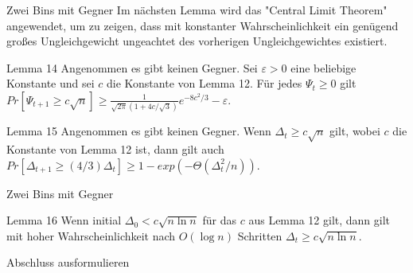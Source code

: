 \documentclass{beamer}
\begin{document}
    \begin{frame}{Zwei Bins mit Gegner}
        Im nächsten Lemma wird das "Central Limit Theorem" angewendet, um zu zeigen,
        dass mit konstanter Wahrscheinlichkeit ein genügend großes Ungleichgewicht
        ungeachtet des vorherigen Ungleichgewichtes existiert.

        \begin{block}{Lemma 14}
            Angenommen es gibt keinen Gegner. Sei \(\varepsilon > 0\) eine beliebige
            Konstante und sei \(c\) die Konstante von Lemma 12. Für jedes
            \(\Psi_t \geq 0\) gilt
            \(Pr[\Psi_{t+1} \geq c\sqrt{n}] \geq \frac{1}{\sqrt{2\pi}(1 + 4c/\sqrt{3})}e^{-8c^{2}/3}-\varepsilon\).
        \end{block}
        \begin{block}{Lemma 15}
            Angenommen es gibt keinen Gegner. Wenn \(\Delta_t \geq c\sqrt{n}\) gilt,
            wobei \(c\) die Konstante von Lemma 12 ist, dann gilt auch
            \(Pr[\Delta_{t+1} \geq (4/3)\Delta_t] \geq 1 - exp(-\Theta(\Delta^2_t / n))\).
        \end{block}
    \end{frame}

    \begin{frame}{Zwei Bins mit Gegner}
        \begin{block}{Lemma 16}
            Wenn initial \(\Delta_0 < c\sqrt{n \ln n}\) für das \(c\) aus Lemma 12
            gilt, dann gilt mit hoher Wahrscheinlichkeit nach \(O(\log n)\)
            Schritten \(\Delta_t \geq c\sqrt{n \ln n}\).
        \end{block}
    \end{frame}

    \begin{frame}{Abschluss}
        ausformulieren
    \end{frame}
\end{document}
